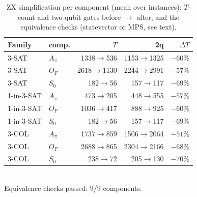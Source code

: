 \begin{table}[t]\centering\small
\caption{ZX simplification per component (mean over instances): $T$-count and two-qubit gates before $\to$ after, and the equivalence checks (statevector or MPS, see text).}\label{tab:zx}
\begin{tabular}{llrrr}\toprule Family & comp. & $T$ & 2q & $\Delta T$\\\midrule
3-SAT & $A_\pi$ & 1338$\to$536 & 1153$\to$1325 & $-60\%$\\
3-SAT & $O_F$ & 2618$\to$1130 & 2244$\to$2991 & $-57\%$\\
3-SAT & $S_0$ & 182$\to$56 & 157$\to$117 & $-69\%$\\
1-in-3-SAT & $A_\pi$ & 473$\to$205 & 448$\to$555 & $-57\%$\\
1-in-3-SAT & $O_F$ & 1036$\to$417 & 888$\to$925 & $-60\%$\\
1-in-3-SAT & $S_0$ & 182$\to$56 & 157$\to$117 & $-69\%$\\
3-COL & $A_\pi$ & 1737$\to$859 & 1506$\to$2064 & $-51\%$\\
3-COL & $O_F$ & 2688$\to$865 & 2304$\to$2166 & $-68\%$\\
3-COL & $S_0$ & 238$\to$72 & 205$\to$130 & $-70\%$\\
\bottomrule\end{tabular}
\\[2pt]\footnotesize Equivalence checks passed: 9/9 components.
\end{table}